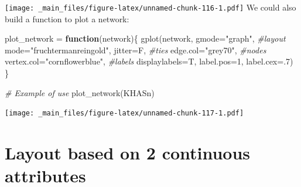 \documentclass[
  notitlepage,
  onecolumn,
  openany]{book}
\newenvironment{Shaded}{\begin{snugshade}}{\end{snugshade}}
\newcommand{\AttributeTok}[1]{\textcolor[rgb]{0.77,0.63,0.00}{#1}}
\newcommand{\CommentTok}[1]{\textcolor[rgb]{0.56,0.35,0.01}{\textit{#1}}}
\newcommand{\ControlFlowTok}[1]{\textcolor[rgb]{0.13,0.29,0.53}{\textbf{#1}}}
\newcommand{\DecValTok}[1]{\textcolor[rgb]{0.00,0.00,0.81}{#1}}
\newcommand{\FunctionTok}[1]{\textcolor[rgb]{0.00,0.00,0.00}{#1}}
\newcommand{\NormalTok}[1]{#1}
\newcommand{\OtherTok}[1]{\textcolor[rgb]{0.56,0.35,0.01}{#1}}
\newcommand{\StringTok}[1]{\textcolor[rgb]{0.31,0.60,0.02}{#1}}
\begin{document}
\texttt{[image: \_main\_files/figure-latex/unnamed-chunk-116-1.pdf]}
We could also build a function to plot a network:

\begin{Shaded}
\begin{Highlighting}[]
\NormalTok{plot\_network }\OtherTok{=} \ControlFlowTok{function}\NormalTok{(network)\{}
    \FunctionTok{gplot}\NormalTok{(network, }
      \AttributeTok{gmode=}\StringTok{"graph"}\NormalTok{,}
      \CommentTok{\#layout}
      \AttributeTok{mode=}\StringTok{"fruchtermanreingold"}\NormalTok{,}
      \AttributeTok{jitter=}\NormalTok{F,}
      \CommentTok{\#ties}
      \AttributeTok{edge.col=}\StringTok{"grey70"}\NormalTok{,}
      \CommentTok{\#nodes}
      \AttributeTok{vertex.col=}\StringTok{"cornflowerblue"}\NormalTok{,}
      \CommentTok{\#labels}
      \AttributeTok{displaylabels=}\NormalTok{T,}
      \AttributeTok{label.pos=}\DecValTok{1}\NormalTok{,}
      \AttributeTok{label.cex=}\NormalTok{.}\DecValTok{7}\NormalTok{)}
\NormalTok{\}}

\CommentTok{\# Example of use}
\FunctionTok{plot\_network}\NormalTok{(KHASn)}
\end{Highlighting}
\end{Shaded}

\texttt{[image: \_main\_files/figure-latex/unnamed-chunk-117-1.pdf]}

\hypertarget{layout-based-on-2-continuous-attributes}{%
\section{Layout based on 2 continuous attributes}\label{layout-based-on-2-continuous-attributes}}
\end{document}
